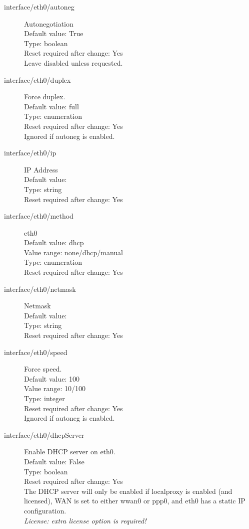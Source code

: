 \begin{description}
\item[interface/eth0/autoneg] Autonegotiation\\
  Default value: True\\
  Type: boolean\\
  Reset required after change: Yes\\
  Leave disabled unless requested.\\

\item[interface/eth0/duplex] Force duplex.\\
  Default value: full\\
  Type: enumeration\\
  Reset required after change: Yes\\
  Ignored if autoneg is enabled.\\

\item[interface/eth0/ip] IP Address\\
  Default value: \\
  Type: string\\
  Reset required after change: Yes\\

\item[interface/eth0/method] eth0\\
  Default value: dhcp\\
  Value range: none/dhcp/manual\\
  Type: enumeration\\
  Reset required after change: Yes\\

\item[interface/eth0/netmask] Netmask\\
  Default value: \\
  Type: string\\
  Reset required after change: Yes\\

\item[interface/eth0/speed] Force speed.\\
  Default value: 100\\
  Value range: 10/100\\
  Type: integer\\
  Reset required after change: Yes\\
  Ignored if autoneg is enabled.\\

\item[interface/eth0/dhcpServer] Enable DHCP server on eth0.\\
  Default value: False\\
  Type: boolean\\
  Reset required after change: Yes\\
  The DHCP server will only be enabled if localproxy is enabled (and licensed), WAN is set to either wwan0 or ppp0, and eth0 has a static IP configuration.\\
  \emph{License: extra license option is required!}\\


\end{description}
